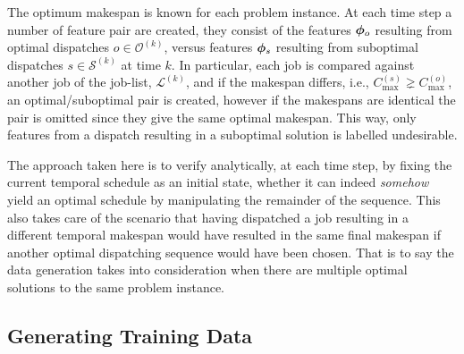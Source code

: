 \documentclass[smallextended]{svjour3}
\begin{document}
The optimum makespan is known for each problem instance. At each time step a 
number of feature pair are created, they consist of the features $\bm{\phi}_o$ 
resulting from optimal dispatches $o\in\mathcal{O}^{(k)}$, versus features 
$\bm{\phi}_s$ resulting from suboptimal dispatches $s\in\mathcal{S}^{(k)}$ at time 
$k$. %
In particular, each job is compared against another job of the job-list, 
$\mathcal{L}^{(k)}$, and if the makespan differs, i.e., $C_{\max}^{(s)}\gneq 
C_{\max}^{(o)}$, an optimal/suboptimal pair is created, however if the 
makespans are identical the pair is omitted since they give the same optimal 
makespan. This way, only features from a dispatch resulting in a suboptimal 
solution is labelled undesirable.

The approach taken here is to verify analytically, at each time step, by fixing 
the current temporal schedule as an initial state, whether it can indeed 
\emph{somehow} yield an optimal schedule by manipulating the remainder of the 
sequence. This also takes care of the scenario that having dispatched a job 
resulting in a different temporal makespan would have resulted in the same 
final makespan if another optimal dispatching sequence would have been chosen. 
That is to say the data generation takes into consideration when there are 
multiple optimal solutions to the same problem instance. 

\subsection{Generating Training Data}\label{sec:gentrdata}
\end{document}
